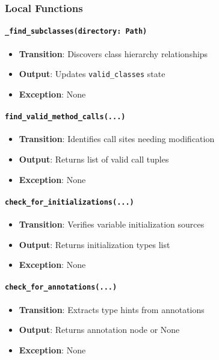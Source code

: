 \documentclass[12pt, titlepage]{article}
\begin{document}
\subsubsection{Local Functions}

\paragraph{\texttt{\_find\_subclasses(directory: Path)}}
\begin{itemize}
\item \textbf{Transition}: Discovers class hierarchy relationships
\item \textbf{Output}: Updates \texttt{valid\_classes} state
\item \textbf{Exception}: None
\end{itemize}

\paragraph{\texttt{find\_valid\_method\_calls(...)}}
\begin{itemize}
\item \textbf{Transition}: Identifies call sites needing modification
\item \textbf{Output}: Returns list of valid call tuples
\item \textbf{Exception}: None
\end{itemize}

\paragraph{\texttt{check\_for\_initializations(...)}}
\begin{itemize}
\item \textbf{Transition}: Verifies variable initialization sources
\item \textbf{Output}: Returns initialization types list
\item \textbf{Exception}: None
\end{itemize}

\paragraph{\texttt{check\_for\_annotations(...)}}
\begin{itemize}
\item \textbf{Transition}: Extracts type hints from annotations
\item \textbf{Output}: Returns annotation node or None
\item \textbf{Exception}: None
\end{itemize}
\end{document}
